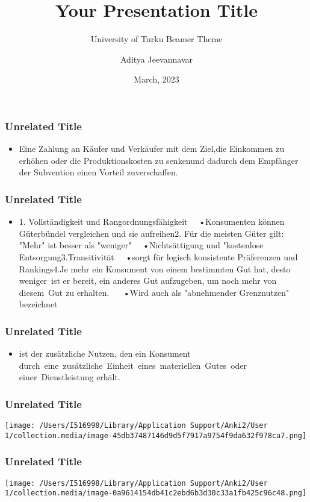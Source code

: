 \documentclass[aspectratio=169]{beamer}
\author{Aditya Jeevannavar}
\title{Your Presentation Title}
\subtitle{University of Turku Beamer Theme}
\institute{
    Department of Biology, \\
    University of Turku
}
\date{March, 2023}
\begin{document}
\begin{frame}
\frametitle{Unrelated Title}


\begin{itemize}
\item Eine Zahlung an Käufer und Verkäufer mit dem Ziel,die Einkommen zu erhöhen oder die Produktionskosten zu senkenund dadurch dem Empfänger der Subvention einen Vorteil zuverschaffen.
\end{itemize}

\note[item]{}
\end{frame}
\begin{frame}
\frametitle{Unrelated Title}


\begin{itemize}
\item 1. Vollständigkeit und Rangordnungsfähigkeit   •Konsumenten können Güterbündel vergleichen und sie aufreihen2. Für die meisten Güter gilt: "Mehr" ist besser als "weniger"   •Nichtsättigung und "kostenlose Entsorgung3.Transitivität   •sorgt für logisch konsistente Präferenzen und Rankings4.Je mehr ein Konsument von einem bestimmten Gut hat, desto weniger ist er bereit, ein anderes Gut aufzugeben, um noch mehr von diesem Gut zu erhalten.    •Wird auch als "abnehmender Grenznutzen" bezeichnet
\end{itemize}

\note[item]{}
\end{frame}
\begin{frame}
\frametitle{Unrelated Title}


\begin{itemize}
\item ist der zusätzliche Nutzen, den ein Konsument durch eine zusätzliche Einheit eines materiellen Gutes oder einer Dienstleistung erhält.
\end{itemize}

\note[item]{}
\end{frame}
\begin{frame}
\frametitle{Unrelated Title}

\begin{center}
\texttt{[image: /Users/I516998/Library/Application Support/Anki2/User 1/collection.media/image-45db37487146d9d5f7917a9754f9da632f978ca7.png]}
\end{center}


\note[item]{}
\end{frame}
\begin{frame}
\frametitle{Unrelated Title}

\begin{center}
\texttt{[image: /Users/I516998/Library/Application Support/Anki2/User 1/collection.media/image-0a9614154db41c2ebd6b3d30c33a1fb425c96c48.png]}
\end{center}


\note[item]{}
\end{frame}
\end{document}
